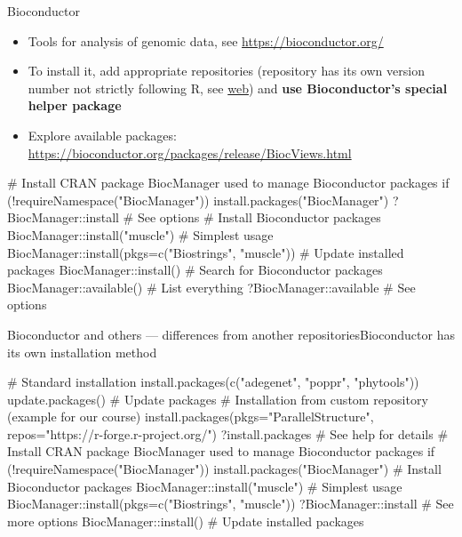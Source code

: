 \documentclass[compress, ucs, xelatex, 11pt, xcolor=svgnames, aspectratio=169,
	hyperref={
		bookmarks=true,
		unicode=true,
		colorlinks=true,
		pdftitle={Molecular data in R},
		plainpages=false,
		pdfauthor={Vojtech Zeisek},
		pdfsubject={Course about phylogeny and evolution in R},
		pdfcreator={XeLaTeX},
		pdfkeywords={R, evolution, phylogeny, molecular data},
		linkcolor=Crimson, %
		anchorcolor=Magenta, %
		citecolor=Magenta, %
		filecolor=Magenta, %
		menucolor=Magenta, %
		urlcolor=DodgerBlue, %
		pdftex},
	url={hyphens, lowtilde} %
	]{beamer}
\begin{document}
\begin{frame}[fragile]{Bioconductor}
	\label{bioc}
	\begin{itemize}
		\item Tools for analysis of genomic data, see \url{https://bioconductor.org/}
		\item To install it, add appropriate repositories (repository has its own version number not strictly following R, see \href{https://bioconductor.org/install}{web}) and \textbf{use Bioconductor's special helper package}
		\item Explore available packages: \href{https://bioconductor.org/packages/}{https://bioconductor.org/packages/release/BiocViews.html}
	\end{itemize}
	\begin{spluscode}
    # Install CRAN package BiocManager used to manage Bioconductor packages
    if (!requireNamespace("BiocManager")) install.packages("BiocManager")
    ?BiocManager::install # See options
    # Install Bioconductor packages
    BiocManager::install("muscle") # Simplest usage
    BiocManager::install(pkgs=c("Biostrings", "muscle"))
    # Update installed packages
    BiocManager::install()
    # Search for Bioconductor packages
    BiocManager::available() # List everything
    ?BiocManager::available # See options
	\end{spluscode}
\end{frame}

\begin{frame}[fragile]{Bioconductor and others --- differences from another repositories}{Bioconductor has its own installation method}
	\label{sources-diff}
	\begin{spluscode}
    # Standard installation
    install.packages(c("adegenet", "poppr", "phytools"))
    update.packages() # Update packages
    # Installation from custom repository (example for our course)
    install.packages(pkgs="ParallelStructure",
      repos="https://r-forge.r-project.org/")
    ?install.packages # See help for details
    # Install CRAN package BiocManager used to manage Bioconductor packages
    if (!requireNamespace("BiocManager")) install.packages("BiocManager")
    # Install Bioconductor packages
    BiocManager::install("muscle") # Simplest usage
    BiocManager::install(pkgs=c("Biostrings", "muscle"))
    ?BiocManager::install # See more options
    BiocManager::install() # Update installed packages
	\end{spluscode}
\end{frame}
\end{document}
